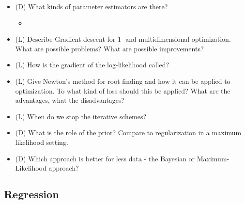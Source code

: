 \begin{itemize}
    \item (D) What kinds of parameter estimators are there?
    \begin{itemize}
        \item {}
    \end{itemize}
    \item (L) Describe Gradient descent for 1- and multidimensional optimization. What are possible problems? What are possible improvements?
    \item (L) How is the gradient of the log-likelihood called?
    \item (L) Give Newton's method for root finding and how it can be applied to optimization. To what kind of loss should this be applied? What are the advantages, what the disadvantages?
    \item (L) When do we stop the iterative schemes?
    \item (D) What is the role of the prior? Compare to regularization in a maximum likelihood setting.
    \item (D) Which approach is better for less data - the Bayesian or Maximum-Likelihood approach?
\end{itemize}


\subsection*{Regression}

